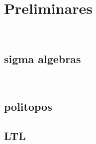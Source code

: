 \chapter{Preliminares}
~\label{cap:pre}

\section{sigma algebras}
~\label{cap:pre:sec:algebra}

\section{politopos}

\section{LTL}

